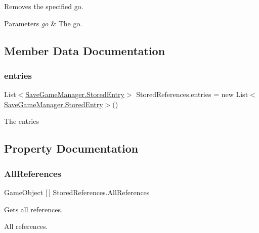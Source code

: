 Removes the specified go. 


\begin{DoxyParams}{Parameters}
{\em go} & The go.\\
\hline
\end{DoxyParams}


\subsection{Member Data Documentation}
\mbox{\label{class_stored_references_a79be997e8a3b8867dec7c1e4816ba270}} 
\subsubsection{\texorpdfstring{entries}{entries}}
{\footnotesize\ttfamily List$<$\hyperlink{class_save_game_manager_1_1_stored_entry}{Save\+Game\+Manager.\+Stored\+Entry}$>$ Stored\+References.\+entries = new List$<$\hyperlink{class_save_game_manager_1_1_stored_entry}{Save\+Game\+Manager.\+Stored\+Entry}$>$()}



The entries 



\subsection{Property Documentation}
\mbox{\label{class_stored_references_a6f87654d72a192e9d0d98c1633c67358}} 
\subsubsection{\texorpdfstring{All\+References}{AllReferences}}
{\footnotesize\ttfamily Game\+Object \mbox{[}$\,$\mbox{]} Stored\+References.\+All\+References\hspace{0.3cm}{\ttfamily [get]}}



Gets all references. 

All references.\mbox{\label{class_stored_references_ab5db5e62d48b445e7c51d4c88e640aa9}} 
